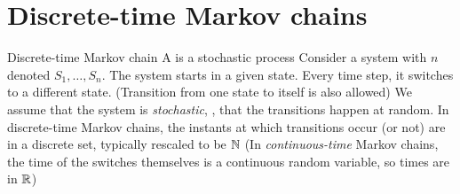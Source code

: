 \documentclass[aspectratio=169]{beamer}
\begin{document}


\section{Discrete-time Markov chains}
\begin{frame}{Discrete-time Markov chain}
A  is a stochastic process
\vfill
Consider a system with $n$  denoted $S_1,\ldots,S_n$. The system starts in a given state. Every time step, it switches to a different state. (Transition from one state to itself is also allowed)
\vfill
We assume that the system is \emph{stochastic}, \ie, that the transitions happen at random. In discrete-time Markov chains, the instants at which transitions occur (or not) are in a discrete set, typically rescaled to be $\mathbb{N}$
\vfill
(In \emph{continuous-time} Markov chains, the time of the switches themselves is a continuous random variable, so times are in $\mathbb{R}$)
\end{frame}
\end{document}
